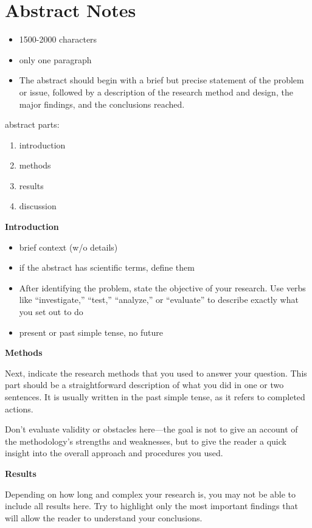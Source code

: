\section*{Abstract Notes}

\begin{itemize}
\item 1500-2000 characters
    \item only one paragraph
    \item The abstract should begin with a brief but precise statement of the problem or issue, followed by a description of the research method and design, the major findings, and the conclusions reached.
\end{itemize}

abstract parts:

\begin{enumerate}
    \item introduction
    \item methods
    \item results
    \item discussion
\end{enumerate}

\textbf{Introduction}

\begin{itemize}
    \item brief context (w/o details)
    \item if the abstract has scientific terms, define them
    \item After identifying the problem, state the objective of your research. Use verbs like “investigate,” “test,” “analyze,” or “evaluate” to describe exactly what you set out to do
    \item present or past simple tense, no future
\end{itemize}

\textbf{Methods}

Next, indicate the research methods that you used to answer your question. This part should be a straightforward description of what you did in one or two sentences. It is usually written in the past simple tense, as it refers to completed actions.

Don't evaluate validity or obstacles here—the goal is not to give an account of the methodology's strengths and weaknesses, but to give the reader a quick insight into the overall approach and procedures you used.

\textbf{Results}

Depending on how long and complex your research is, you may not be able to include all results here. Try to highlight only the most important findings that will allow the reader to understand your conclusions.

